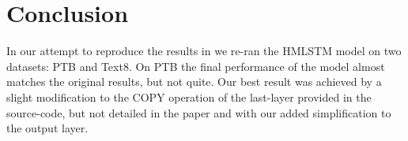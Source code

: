 
\section{Conclusion}
In our attempt to reproduce the results in \cite{chung2016hierarchical} 
we re-ran the HMLSTM model on two datasets: PTB and Text8. On PTB the 
final performance of the model almost matches the original results, 
but not quite. Our best result was achieved by a slight modification 
to the COPY operation of the last-layer provided in the source-code, 
but not detailed in the paper and with our added simplification to 
the output layer. 

